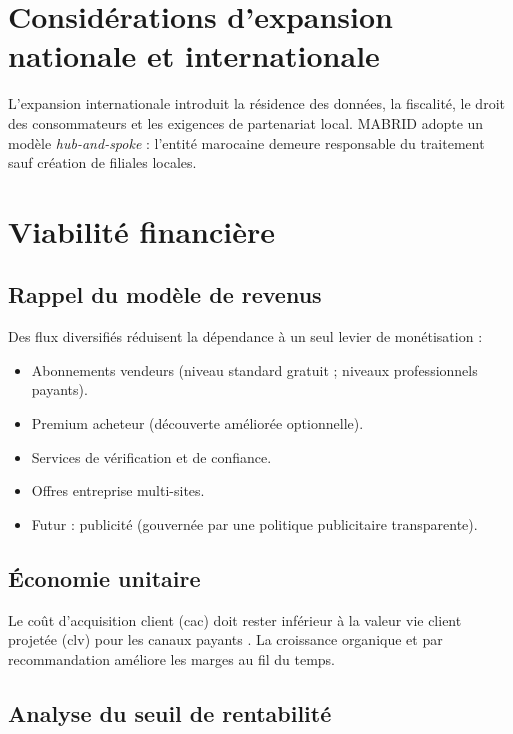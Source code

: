 
\section{Considérations d'expansion nationale et internationale}

L'expansion internationale introduit la résidence des données, la fiscalité, le droit des consommateurs et les exigences de partenariat local. MABRID adopte un modèle \emph{hub-and-spoke} : l'entité marocaine demeure responsable du traitement sauf création de filiales locales.

\section{Viabilité financière}

\subsection{Rappel du modèle de revenus}

Des flux diversifiés réduisent la dépendance à un seul levier de monétisation :
\begin{itemize}
  \item Abonnements vendeurs (niveau standard gratuit ; niveaux professionnels payants).
  \item Premium acheteur (découverte améliorée optionnelle).
  \item Services de vérification et de confiance.
  \item Offres entreprise multi-sites.
  \item Futur : publicité (gouvernée par une politique publicitaire transparente).
\end{itemize}

\subsection{Économie unitaire}

Le coût d'acquisition client (\gls{cac}) doit rester inférieur à la valeur vie client projetée (\gls{clv}) pour les canaux payants \parencite{skok2014saas}. La croissance organique et par recommandation améliore les marges au fil du temps.

\subsection{Analyse du seuil de rentabilité}


